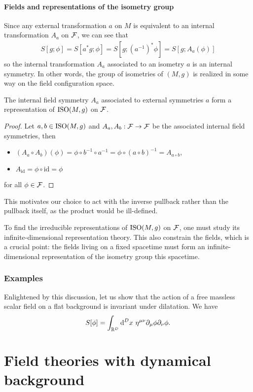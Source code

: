 \documentclass[a4paper,10pt]{article}
\begin{document}
    \subsection{Fields and representations of the isometry group}

        
        
        Since any external transformation $a$ on $M$ is equivalent to an internal transformation $A_a$ on $\mathcal{F}$, we can see that
        \begin{eqnarray}
            S[g;\phi]=S[a^*g;\phi]=S[g;(a^{-1})^*\phi]=S[g;A_a(\phi)]
        \end{eqnarray}
        so the internal transformation $A_a$ associated to an isometry $a$ is an internal symmetry. In other words, the group of isometries of $(M,g)$ is realized in some way on the field configuration space.
        \begin{prop}
            The internal field symmetry $A_a$ associated to external symmetries $a$ form a representation of $\text{ISO}(M,g)$ on $\mathcal{F}$.
        \end{prop}
        \begin{proof}
            Let $a,b\in\text{ISO}(M,g)$ and $A_a,A_b:\mathcal{F}\to\mathcal{F}$ be the associated internal field symmetries, then
            \begin{itemize}
                \item $(A_a\circ A_b)(\phi)=\phi\circ b^{-1}\circ a^{-1} = \phi\circ(a\circ b)^{-1} = A_{a\circ b}$,
                \item $A_{\text{id}} = \phi\circ\text{id}=\phi$
            \end{itemize}
            for all $\phi\in\mathcal{F}$.
        \end{proof}
        This motivates our choice to act with the inverse pullback rather than the pullback itself, as the product would be ill-defined.

        To find the irreducible representations of $\text{ISO}(M,g)$ on $\mathcal{F}$, one must study its infinite-dimensional representation theory. This also constrain the fields, which is a crucial point: the fields living on a fixed spacetime must form an infinite-dimensional representation of the isometry group this spacetime.
    
\section{Examples}

    \begin{examp}
            Enlightened by this discussion, let us show that the action of a free massless scalar field on a flat background is invariant under dilatation. We have
            \begin{equation}
                S[\phi]=\int_{\mathbb{R}^D}\text{d}^Dx~\eta^{\mu\nu}\partial_\mu\phi\partial_\nu\phi.
            \end{equation}
    \end{examp}

\part{Field theories with dynamical background}

\pagebreak

\nocite{*}



\printbibliography
\end{document}

